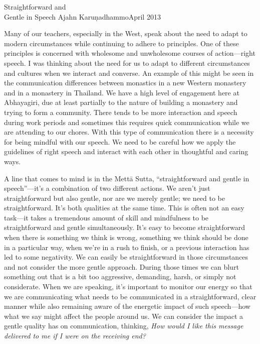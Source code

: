 {Straightforward and\\Gentle in Speech}
{Ajahn Karuṇadhammo}{April 2013}

Many of our teachers, especially in the West, speak about the need to 
adapt to modern circumstances while continuing to adhere to principles. 
One of these principles is concerned with wholesome and unwholesome 
courses of action---right speech. I was thinking about the need for us 
to adapt to different circumstances and cultures when we interact and 
converse. An example of this might be seen in the communication 
differences between monastics in a new Western monastery and in a 
monastery in Thailand. We have a high level of engagement here at 
Abhayagiri, due at least partially to the nature of building a 
monastery and trying to form a community. There tends to be more 
interaction and speech during work periods and sometimes this requires 
quick communication while we are attending to our chores. With this 
type of communication there is a necessity for being mindful with our 
speech. We need to be careful how we apply the guidelines of right 
speech and interact with each other in thoughtful and caring ways.

A line that comes to mind is in the Mettā Sutta, ``straightforward and 
gentle in speech''---it's a combination of two different actions. We 
aren't just straightforward but also gentle, nor are we merely gentle; 
we need to be straightforward. It's both qualities at the same time. 
This is often not an easy task---it takes a tremendous amount of skill 
and mindfulness to be straightforward and gentle simultaneously. It's 
easy to become straightforward when there is something we think is 
wrong, something we think should be done in a particular way, when 
we're in a rush to finish, or a previous interaction has led to some 
negativity. We can easily be straightforward in those circumstances and 
not consider the more gentle approach. During those times we can blurt 
something out that is a bit too aggressive, demanding, harsh, or simply 
not considerate. When we are speaking, it's important to monitor our 
energy so that we are communicating what needs to be communicated in a 
straightforward, clear manner while also remaining aware of the 
energetic impact of such speech---how what we say might affect the 
people around us. We can consider the impact a gentle quality has on 
communication, thinking, \emph{How would I like this message delivered 
to me if I were on the receiving end?}


